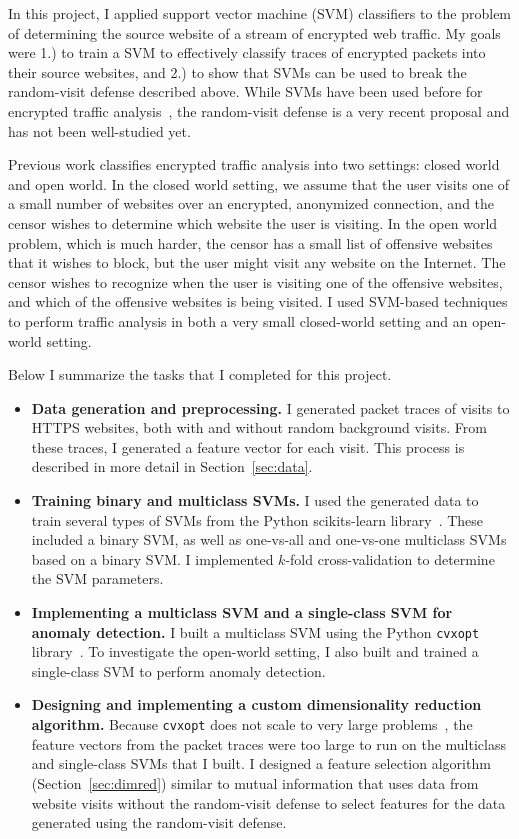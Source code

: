 \documentclass[10pt, twocolumn]{article}
\begin{document}
In this project, I applied support vector machine (SVM) classifiers 
to the problem of determining the source website of a stream of 
encrypted web traffic. My goals were 1.) to train a SVM to 
effectively classify traces of encrypted packets into their source 
websites, and 2.) to show that SVMs can be used to break the random-visit 
defense described above. While SVMs have been used before for 
encrypted traffic analysis~\cite{torfingerprinting}, the random-visit defense 
is a very recent proposal and has not been well-studied yet.

Previous work classifies encrypted traffic analysis into two settings: 
closed world and open world. In the closed world setting, we assume that 
the user visits one of a small number of websites over an encrypted, 
anonymized connection, and the censor wishes to determine which website 
the user is visiting. In the open world problem, which is much harder, the 
censor has a small list of offensive websites that it wishes to block, but 
the user might visit any website on the Internet. The censor wishes to 
recognize when the user is visiting one of the offensive websites, and which 
of the offensive websites is being visited. I used SVM-based techniques to 
perform traffic analysis in both a very small closed-world setting and an 
open-world setting.

Below I summarize the tasks that I completed for this project.
\begin{itemize}
\item \textbf{Data generation and preprocessing.} I generated packet 
traces of visits to HTTPS websites, both with and without random 
background visits. From these traces, I generated a feature vector for 
each visit. This process is described in more detail in Section~\ref{sec:data}. 
\item \textbf{Training binary and multiclass SVMs.} I used the 
generated data to train several types of SVMs from the Python scikits-learn 
library~\cite{sklearn}. These included a binary SVM, as well as one-vs-all
and one-vs-one multiclass SVMs based on a binary SVM. I implemented $k$-fold cross-validation 
to determine the SVM parameters.
\item \textbf{Implementing a multiclass SVM and a single-class SVM for anomaly detection.} 
I built a multiclass SVM using the Python \texttt{cvxopt} library~\cite{cvxopt}.
 To investigate the 
open-world setting, I also built and trained a single-class SVM to perform 
anomaly detection.
\item \textbf{Designing and implementing a custom dimensionality reduction algorithm.} 
Because \texttt{cvxopt} does not scale to very large problems~\cite{cvxoptscale}, the feature vectors from the 
packet traces were too large to run on the multiclass and single-class SVMs that I built. 
I designed a feature selection algorithm (Section~\ref{sec:dimred}) similar to mutual information 
that uses data from website visits without the 
random-visit defense to select features for the data generated using the random-visit defense.
\end{itemize}
\end{document}
